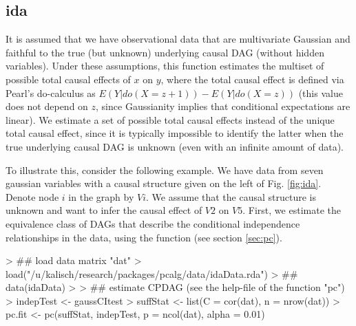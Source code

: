 \documentclass[article]{jss}
\begin{document}
\subsection{ida} \label{sec:ida}
It is assumed that we have observational data that are multivariate
Gaussian and faithful to the true (but unknown) underlying causal DAG
(without hidden variables).  Under these assumptions, this function
estimates the multiset of possible total causal effects of $x$ on $y$,
where the total causal effect is defined via Pearl's do-calculus as
$E(Y|do(X=z+1))-E(Y|do(X=z))$ (this value does not depend on $z$, since
Gaussianity implies that conditional expectations are linear). We estimate
a set of possible total causal effects instead of the unique total causal
effect, since it is typically impossible to identify the latter when the
true underlying causal DAG is unknown (even with an infinite amount of
data).

To illustrate this, consider the following example. We have data from seven
gaussian variables with a causal structure given on the left of
Fig. \ref{fig:ida}. Denote node $i$ in the graph by $Vi$. We assume that
the causal structure is unknown and want to infer the causal effect of $V2$
on $V5$. First, we estimate the equivalence class of DAGs that describe the
conditional independence relationships in the data, using the function
 (see section \ref{sec:pc}).

\begin{Schunk}
\begin{Sinput}
> ## load data matrix "dat"
> load("/u/kalisch/research/packages/pcalg/data/idaData.rda")
> ## data(idaData)
> 
> ## estimate CPDAG (see the help-file of the function "pc")
> indepTest <- gaussCItest 
> suffStat <- list(C = cor(dat), n = nrow(dat))
> pc.fit <- pc(suffStat, indepTest, p = ncol(dat), alpha = 0.01)
\end{Sinput}
\end{Schunk}
\end{document}
